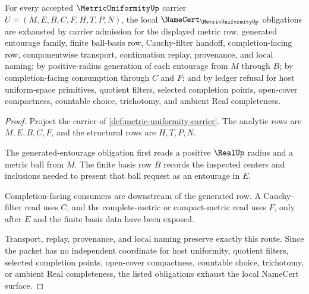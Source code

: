 \begin{theorem}
\label{thm:metric-uniformity-namecert-obligations}
For every accepted $\MetricUniformityUp$ carrier $U=(M,E,B,C,F,H,T,P,N)$, the local $\NameCert_{\MetricUniformityUp}$ obligations are exhausted by carrier admission for the displayed metric row, generated entourage family, finite ball-basis row, Cauchy-filter handoff, completion-facing row, componentwise transport, continuation replay, provenance, and local naming; by positive-radius generation of each entourage from $M$ through $B$; by completion-facing consumption through $C$ and $F$; and by ledger refusal for host uniform-space primitives, quotient filters, selected completion points, open-cover compactness, countable choice, trichotomy, and ambient Real completeness.
\end{theorem}
\begin{proof}
Project the carrier of \autoref{def:metric-uniformity-carrier}. The analytic rows are $M,E,B,C,F$, and the structural rows are $H,T,P,N$.

The generated-entourage obligation first reads a positive $\RealUp$ radius and a metric ball from $M$. The finite basis row $B$ records the inspected centers and inclusions needed to present that ball request as an entourage in $E$.

Completion-facing consumers are downstream of the generated row. A Cauchy-filter read uses $C$, and the complete-metric or compact-metric read uses $F$, only after $E$ and the finite basis data have been exposed.

Transport, replay, provenance, and local naming preserve exactly this route. Since the packet has no independent coordinate for host uniformity, quotient filters, selected completion points, open-cover compactness, countable choice, trichotomy, or ambient Real completeness, the listed obligations exhaust the local NameCert surface.
\end{proof}


